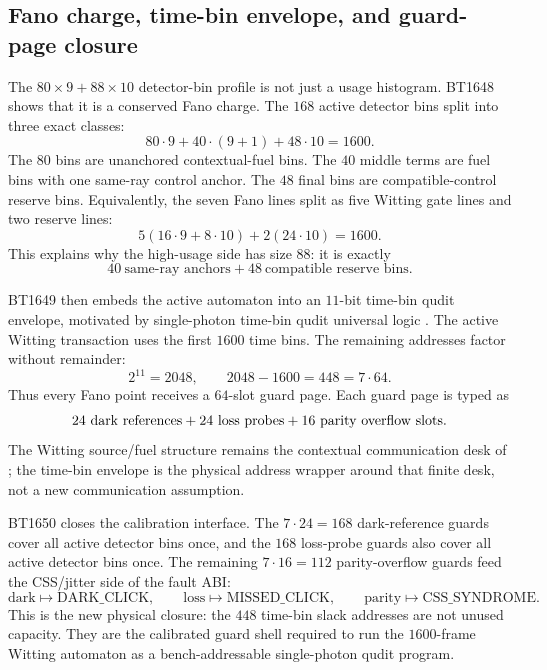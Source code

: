 \subsection{Fano charge, time-bin envelope, and guard-page closure}
\label{sec:bt1648-bt1650-fano-timebin-guard}

The \(80\times9+88\times10\) detector-bin profile is not just a usage
histogram.  BT1648 shows that it is a conserved Fano charge.  The \(168\)
active detector bins split into three exact classes:
\[
  80\cdot9+40\cdot(9+1)+48\cdot10=1600.
\]
The \(80\) bins are unanchored contextual-fuel bins.  The \(40\) middle
terms are fuel bins with one same-ray control anchor.  The \(48\) final bins
are compatible-control reserve bins.  Equivalently, the seven Fano lines split
as five Witting gate lines and two reserve lines:
\[
  5(16\cdot9+8\cdot10)+2(24\cdot10)=1600.
\]
This explains why the high-usage side has size \(88\): it is exactly
\[
  40\ \text{same-ray anchors}+48\ \text{compatible reserve bins}.
\]

BT1649 then embeds the active automaton into an \(11\)-bit time-bin qudit
envelope, motivated by single-photon time-bin qudit universal logic
\cite{delteil-timebin-qudit}.  The active Witting transaction uses the first
\(1600\) time bins.  The remaining addresses factor without remainder:
\[
  2^{11}=2048,\qquad 2048-1600=448=7\cdot64.
\]
Thus every Fano point receives a \(64\)-slot guard page.  Each guard page is
typed as
\[
  24\ {\rm dark\ references}
  +24\ {\rm loss\ probes}
  +16\ {\rm parity\ overflow\ slots}.
\]
The Witting source/fuel structure remains the contextual communication desk of
\cite{vlasov-witting-communications}; the time-bin envelope is the physical
address wrapper around that finite desk, not a new communication assumption.

BT1650 closes the calibration interface.  The \(7\cdot24=168\) dark-reference
guards cover all active detector bins once, and the \(168\) loss-probe guards
also cover all active detector bins once.  The remaining \(7\cdot16=112\)
parity-overflow guards feed the CSS/jitter side of the fault ABI:
\[
  \text{dark}\mapsto\text{DARK\_CLICK},\qquad
  \text{loss}\mapsto\text{MISSED\_CLICK},\qquad
  \text{parity}\mapsto\text{CSS\_SYNDROME}.
\]
This is the new physical closure: the \(448\) time-bin slack addresses are not
unused capacity.  They are the calibrated guard shell required to run the
\(1600\)-frame Witting automaton as a bench-addressable single-photon qudit
program.
